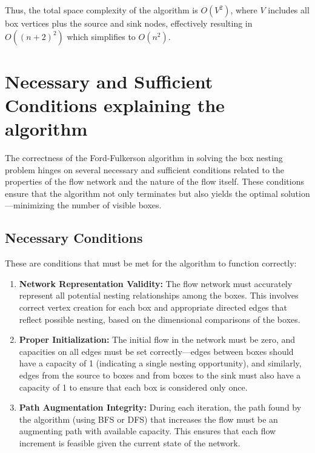 \documentclass{article}
\begin{document}
        Thus, the total space complexity of the algorithm is \(O(V^2)\), where \(V\) includes all box vertices plus the source and sink nodes, effectively resulting in \(O((n+2)^2)\) which simplifies to \(O(n^2)\).

\section{Necessary and Sufficient Conditions explaining the algorithm}

    The correctness of the Ford-Fulkerson algorithm in solving the box nesting problem hinges on several necessary and sufficient conditions related to the properties of the flow network and the nature of the flow itself. These conditions ensure that the algorithm not only terminates but also yields the optimal solution—minimizing the number of visible boxes.
    
    \subsection{Necessary Conditions}
        These are conditions that must be met for the algorithm to function correctly:
        \begin{enumerate}
            \item \textbf{Network Representation Validity:} The flow network must accurately represent all potential nesting relationships among the boxes. This involves correct vertex creation for each box and appropriate directed edges that reflect possible nesting, based on the dimensional comparisons of the boxes.
            \item \textbf{Proper Initialization:} The initial flow in the network must be zero, and capacities on all edges must be set correctly—edges between boxes should have a capacity of 1 (indicating a single nesting opportunity), and similarly, edges from the source to boxes and from boxes to the sink must also have a capacity of 1 to ensure that each box is considered only once.
            \item \textbf{Path Augmentation Integrity:} During each iteration, the path found by the algorithm (using BFS or DFS) that increases the flow must be an augmenting path with available capacity. This ensures that each flow increment is feasible given the current state of the network.
        \end{enumerate}
    
\end{document}
